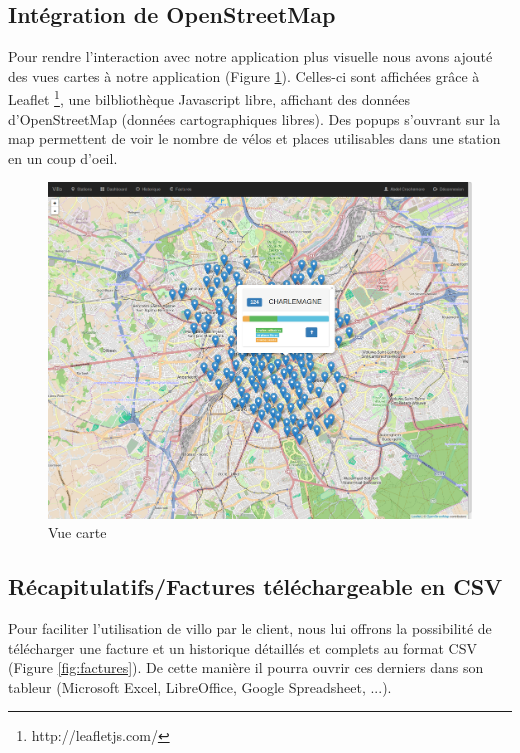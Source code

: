 \documentclass[a4paper,10pt]{article}
\begin{document}
\subsection{Intégration de OpenStreetMap}
Pour rendre l'interaction avec notre application plus visuelle nous avons ajouté
des vues cartes à notre application (Figure \ref{fig:map}). Celles-ci sont affichées grâce à Leaflet
\footnote{http://leafletjs.com/}, une bilbliothèque Javascript libre, affichant
des données d'OpenStreetMap (données cartographiques libres). Des popups
s'ouvrant sur la map permettent de voir le nombre de vélos et places utilisables
dans une station en un coup d'oeil.

\begin{figure}[H]
  \centering
  \includegraphics[width=.9\textwidth]{map.png}
  \caption{\label{fig:map} Vue carte}
\end{figure}

\subsection{Récapitulatifs/Factures téléchargeable en CSV} %

Pour faciliter l'utilisation de villo par le client, nous lui offrons la possibilité
de télécharger une facture et un historique détaillés et complets au format CSV (Figure \ref{fig:factures}).
De cette manière il pourra ouvrir ces derniers dans son tableur (Microsoft Excel,
LibreOffice, Google Spreadsheet, ...).
\end{document}
